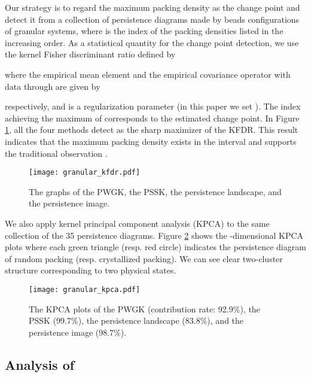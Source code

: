 \documentclass{article}
\begin{document}
Our strategy is to regard the maximum packing density as the change point and detect it from a collection  of persistence diagrams made by beads configurations of granular systems, where  is the index of the packing densities listed in the increasing order.
As a statistical quantity for the change point detection, we use the kernel Fisher discriminant ratio \cite{HMB09} defined by

where the empirical mean element  and the empirical covariance operator  with data  through  are given by

respectively, and  is a regularization parameter (in this paper we set ).
The index  achieving the maximum of  corresponds to the estimated change point. 
In Figure \ref{fig:packing_KFDR}, all the four methods detect  as the sharp maximizer of the KFDR. This result indicates that the maximum packing density  exists in the interval  and supports the traditional observation  \cite{An72}.

\begin{figure}[htbp]
\begin{center}
\texttt{[image: granular\_kfdr.pdf]}
\end{center}
\vspace{-3mm}
\caption{The  graphs of the PWGK, the PSSK, the persistence landscape, and the persistence image.}
\label{fig:packing_KFDR}
\end{figure}

We also apply kernel principal component analysis (KPCA) to the same collection of the 35 persistence diagrams. 
Figure \ref{fig:packing_kpca} shows the -dimensional KPCA plots where each green triangle (resp. red circle) indicates the persistence diagram of random packing (resp. crystallized packing).
We can see clear two-cluster structure corresponding to two physical states.

\begin{figure}[htbp]
\begin{center}
\texttt{[image: granular\_kpca.pdf]}
\end{center}
\vspace{-3mm}
\caption{The KPCA plots of the PWGK (contribution rate: 92.9\%), the PSSK (99.7\%), the persistence landscape (83.8\%), and the persistence image (98.7\%).}
\label{fig:packing_kpca}
\end{figure}





\subsection{Analysis of }
\label{subsec:glass}
\end{document}
